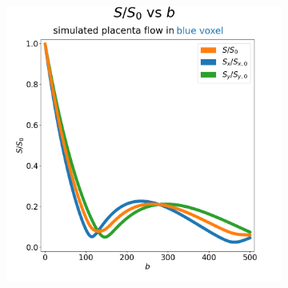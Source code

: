         \begin{figure}
            \vspace{-1cm}
            \begin{centering}
                \begin{subfigure}{0.45\textwidth}
                    \begin{centering}
                        \includegraphics[width=\textwidth]{diagrams/results-mri/simulated-placenta/mri-spins_sall-vs-b_2D_placenta_1_672.png}
                        \caption{}
                        \label{fig:mri-placenta-comparison-2:blue-s-vs-b}
                    \end{centering}
                \end{subfigure}
                \begin{subfigure}{0.45\textwidth}
                    \begin{centering}

\end{centering}
\end{subfigure}
\end{centering}
\end{figure}
